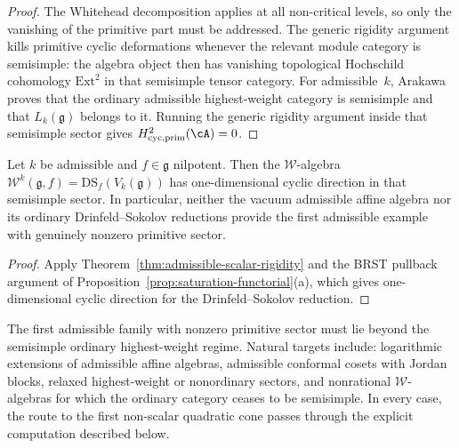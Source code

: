 \begin{proof}
The Whitehead decomposition applies at all non-critical levels, so
only the vanishing of the primitive part must be addressed. The
generic rigidity argument kills primitive cyclic deformations whenever
the relevant module category is semisimple: the algebra object then
has vanishing topological Hochschild cohomology $\mathrm{Ext}^2$ in that semisimple tensor
category. For admissible~$k$,
Arakawa~\cite{Arakawa2016RationalAdmissible} proves that the ordinary
admissible highest-weight category is semisimple and that
$L_k(\mathfrak{g})$ belongs to it. Running the generic rigidity
argument inside that semisimple sector gives
$H^2_{\mathrm{cyc,prim}}(\cA) = 0$.
\end{proof}

\begin{corollary}
\label{cor:ds-not-first-frontier}
Let $k$ be admissible and $f \in \mathfrak{g}$ nilpotent. Then the
$\mathcal{W}$-algebra
$\mathcal{W}^k(\mathfrak{g}, f)
 = \mathrm{DS}_f(V_k(\mathfrak{g}))$
has one-dimensional cyclic direction in that semisimple sector.
In particular, neither the vacuum admissible
affine algebra nor its ordinary Drinfeld--Sokolov reductions provide
the first admissible example with genuinely nonzero primitive sector.
\end{corollary}

\begin{proof}
Apply Theorem~\ref{thm:admissible-scalar-rigidity} and the
BRST pullback argument of
Proposition~\ref{prop:saturation-functorial}(a), which gives
one-dimensional cyclic direction for the Drinfeld--Sokolov
reduction.
\end{proof}

\begin{remark}
\label{rem:true-admissible-frontier}
The first admissible family with nonzero primitive sector must lie
beyond the semisimple ordinary highest-weight regime. Natural targets
include: logarithmic extensions of admissible affine algebras,
admissible conformal cosets with Jordan blocks, relaxed highest-weight
or nonordinary sectors, and nonrational $\mathcal{W}$-algebras for
which the ordinary category ceases to be semisimple. In every case,
the route to the first non-scalar quadratic cone passes through the
explicit computation described below.
\end{remark}


